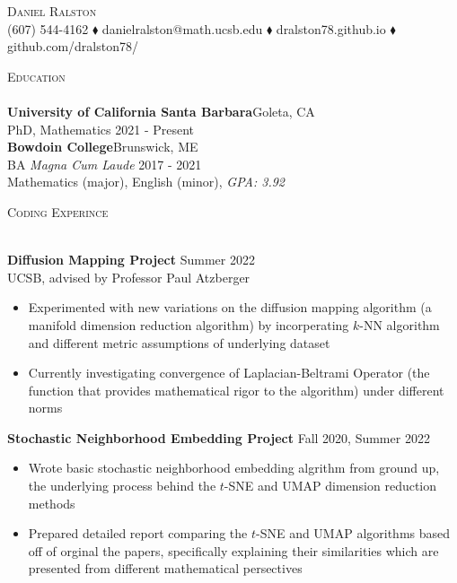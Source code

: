 \documentclass[a4paper]{article}
\newcommand{\lineunder} {
    \vspace*{-8pt} \\
    \hspace*{-18pt} \hrulefill \\
}
\newcommand{\header} [1] {
    {\hspace*{-18pt}\vspace*{6pt} \textsc{#1}}
    \vspace*{-6pt} \lineunder
}
\begin{document}
\vspace*{-40pt}

    

\vspace*{1mm}
\begin{center}
	{\Huge \scshape {Daniel Ralston}}\\
    \vspace{2mm}
    (607) 544-4162 $\blacklozenge$ danielralston@math.ucsb.edu $\blacklozenge$ dralston78.github.io $\blacklozenge$ github.com/dralston78/\\
\end{center}
\vspace{2mm}
\header{\Large Education}
\vspace{2mm}
\textbf{University of California Santa Barbara}\hfill Goleta, CA\\
PhD, Mathematics \hfill 2021 - Present\\
\vspace{2mm}
\textbf{Bowdoin College}\hfill Brunswick, ME\\
BA \emph{Magna Cum Laude} \hfill 2017 - 2021\\
Mathematics (major), English (minor), \textit{GPA: 3.92}\\
\vspace{4mm}

\header{\Large Coding Experince}
\vspace{2mm}

\textbf{Diffusion Mapping Project} \hfill Summer 2022\\
UCSB, advised by Professor Paul Atzberger
\vspace{2mm}
\begin{itemize} [topsep=0mm,itemsep=1mm,partopsep=1mm, parsep=1mm]
	\item Experimented with new variations on the diffusion mapping algorithm (a manifold dimension reduction algorithm) by incorperating $k$-NN algorithm and different metric assumptions of underlying dataset
	\item Currently investigating convergence of Laplacian-Beltrami Operator (the function that provides mathematical rigor to the algorithm) under different norms
\end{itemize}
\vspace{2mm}

\textbf{Stochastic Neighborhood Embedding Project} \hfill Fall 2020, Summer 2022\\
\vspace{2mm}
\begin{itemize} [topsep=0mm,itemsep=1mm,partopsep=1mm, parsep=1mm]
	\item Wrote basic stochastic neighborhood embedding algrithm from ground up, the underlying process behind the $t$-SNE and UMAP dimension reduction methods
	\item Prepared detailed report comparing the $t$-SNE and UMAP algorithms based off of orginal the papers, specifically explaining their similarities which are presented from different mathematical persectives %
\end{itemize}
\vspace{2mm}
\end{document}

